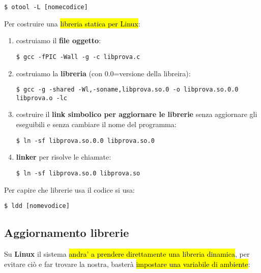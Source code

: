 \begin{lstlisting}
$ otool -L [nomecodice]
\end{lstlisting}


Per costruire una \hl{libreria statica per Linux}:

\begin{enumerate}
	\item costruiamo il \textbf{file oggetto}:

\begin{lstlisting}
$ gcc -fPIC -Wall -g -c libprova.c
\end{lstlisting}

	\item costruiamo la \textbf{libreria} (con 0.0=versione della libreira):

\begin{lstlisting}
$ gcc -g -shared -Wl,-soname,libprova.so.0 -o libprova.so.0.0 libprova.o -lc 
\end{lstlisting}

	\item costruire il \textbf{link simbolico per aggiornare le librerie} senza aggiornare gli eseguibili e senza cambiare il nome del programma:

\begin{lstlisting}
$ ln -sf libprova.so.0.0 libprova.so.0 
\end{lstlisting}

	\item \textbf{linker} per risolve le chiamate:

\begin{lstlisting}
$ ln -sf libprova.so.0 libprova.so
\end{lstlisting}

\end{enumerate}


Per capire che librerie usa il codice si usa:

\begin{lstlisting}
$ ldd [nomevodice]
\end{lstlisting}


\subsection{Aggiornamento librerie}

Su \textbf{Linux} il sistema \hl{andra' a prendere direttamente una libreria dinamica}, per evitare ciò e far trovare la nostra, basterà \hl{impostare una variabile di ambiente}:

